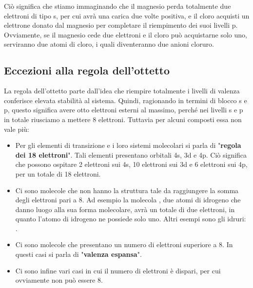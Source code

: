 Ciò significa che stiamo immaginando che il magnesio perda totalmente due elettroni di tipo s, per cui avrà una carica due volte positiva, e il cloro acquisti un elettrone donato dal magnesio per completare il riempimento dei suoi livelli p. Ovviamente, se il magnesio cede due elettroni e il cloro può acquistarne solo uno, serviranno due atomi di cloro, i quali diventeranno due anioni cloruro.
\subsection{Eccezioni alla regola dell'ottetto}
La regola dell'ottetto parte dall'idea che riempire totalmente i livelli di valenza conferisce elevata stabilità al sistema. Quindi, ragionando in termini di blocco s e p, questo significa avere otto elettroni esterni al massimo, perché nei livelli s e p in totale riusciamo a mettere 8 elettroni. Tuttavia per alcuni composti essa non vale più:
\begin{itemize}
    \item Per gli elementi di transizione e i loro sistemi molecolari si parla di "\textbf{regola dei 18 elettroni}". Tali elementi presentano orbitali 4s, 3d e 4p. Ciò significa che possono ospitare 2 elettroni sui 4s, 10 elettroni sui 3d e 6 elettroni sui 4p, per un totale di 18 elettroni.
    \item Ci sono molecole che non hanno la struttura tale da raggiungere la somma degli elettroni pari a 8. Ad esempio la molecola , due atomi di idrogeno che danno luogo alla sua forma molecolare, avrà un totale di due elettroni, in quanto l'atomo di idrogeno ne possiede solo uno. Altri esempi sono gli idruri: .
    \item Ci sono molecole che presentano un numero di elettroni superiore a 8. In questi casi si parla di "\textbf{valenza espansa}".
    \item Ci sono infine vari casi in cui il numero di elettroni è dispari, per cui ovviamente non può essere 8.
\end{itemize}
\newpage
